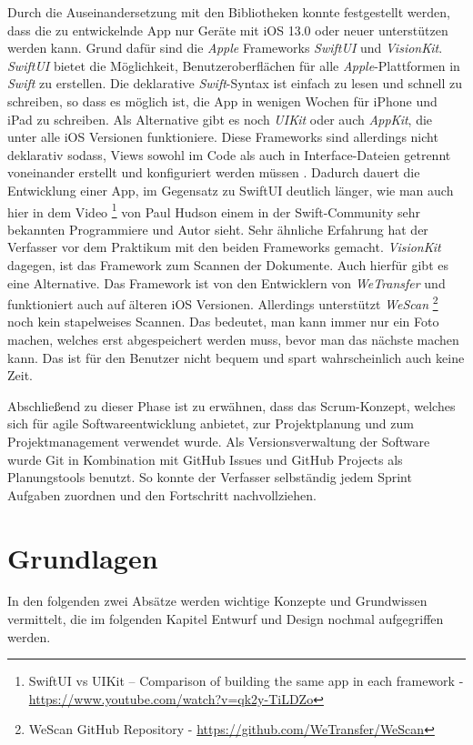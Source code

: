 \documentclass[nomenclature, oneside, 150]{HSMW-Thesis}
\begin{document}
		Durch die Auseinandersetzung mit den Bibliotheken konnte festgestellt werden, dass die zu entwickelnde App nur Geräte mit iOS 13.0 oder neuer unterstützen werden kann. Grund dafür sind die \textit{Apple} Frameworks \textit{SwiftUI} und \textit{VisionKit}. \textit{SwiftUI} bietet die Möglichkeit, Benutzeroberflächen für alle \textit{Apple}-Plattformen in \textit{Swift} zu erstellen. Die deklarative \textit{Swift}-Syntax ist einfach zu lesen und schnell zu schreiben, so dass es möglich ist, die App in wenigen Wochen für iPhone und iPad zu schreiben. Als Alternative gibt es noch \textit{UIKit} oder auch \textit{AppKit}, die unter alle iOS Versionen funktioniere. Diese Frameworks sind allerdings nicht deklarativ sodass, Views sowohl im Code als auch in Interface-Dateien getrennt voneinander erstellt und konfiguriert werden müssen \cite{sillmann_einstieg_nodate}. Dadurch dauert die Entwicklung einer App, im Gegensatz zu SwiftUI deutlich länger, wie man auch hier in dem Video \footnote{SwiftUI vs UIKit – Comparison of building the same app in each framework - \href{https://www.youtube.com/watch?v=qk2y-TiLDZo}{\url{https://www.youtube.com/watch?v=qk2y-TiLDZo}} } von Paul Hudson einem in der Swift-Community sehr bekannten Programmiere und Autor sieht. Sehr ähnliche Erfahrung hat der Verfasser vor dem Praktikum mit den beiden Frameworks gemacht. \textit{VisionKit} dagegen, ist das Framework zum Scannen der Dokumente. Auch hierfür gibt es eine Alternative. Das Framework ist von den Entwicklern von \textit{WeTransfer} und funktioniert auch auf älteren iOS Versionen. Allerdings unterstützt \textit{WeScan} \footnote{WeScan GitHub Repository - \href{https://github.com/WeTransfer/WeScan}{\url{https://github.com/WeTransfer/WeScan}}} noch kein stapelweises Scannen. Das bedeutet, man kann immer nur ein Foto machen, welches erst abgespeichert werden muss, bevor man das nächste machen kann. Das ist für den Benutzer nicht bequem und spart wahrscheinlich auch keine Zeit.

		Abschließend zu dieser Phase ist zu erwähnen, dass das Scrum-Konzept, welches sich für agile Softwareentwicklung anbietet, zur Projektplanung und zum Projektmanagement verwendet wurde. Als Versionsverwaltung der Software wurde Git in Kombination mit GitHub Issues und GitHub Projects als Planungstools benutzt. So konnte der Verfasser selbständig jedem Sprint Aufgaben zuordnen und den Fortschritt nachvollziehen.

	\section{Grundlagen}
			In den folgenden zwei Absätze werden wichtige Konzepte und Grundwissen vermittelt, die im folgenden Kapitel Entwurf und Design nochmal aufgegriffen werden.
\end{document}
